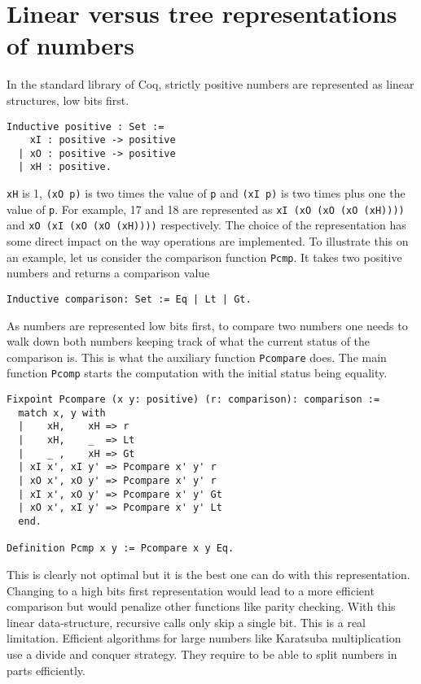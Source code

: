 \section{Linear versus tree representations of numbers\label{ZTree}}

In the standard library of {\sc Coq}, strictly positive numbers are represented as linear structures, low bits first.

\begin{verbatim}
Inductive positive : Set :=
    xI : positive -> positive 
  | xO : positive -> positive 
  | xH : positive.
\end{verbatim}
 {\tt xH} is 1, {\tt (xO p)} is two times the value of {\tt p}
 and {\tt (xI p)} is two times plus one the value of {\tt p}.
For example, 17 and 18 are represented as {\tt xI (xO (xO (xO (xH))))} and
{\tt xO (xI (xO (xO (xH))))} respectively. The choice of the representation
has some direct impact on the way operations are implemented. To illustrate this on an example,
let us consider the comparison function {\tt Pcmp}. It takes two positive numbers
and returns a comparison value
\begin{verbatim}
Inductive comparison: Set := Eq | Lt | Gt.
\end{verbatim}
As numbers are represented low bits first, to compare two numbers 
one needs to walk down both numbers keeping track of what the current status
of the comparison is. This is what the auxiliary function {\tt Pcompare} does. The main 
function {\tt Pcomp} starts the computation with the initial status being equality.
\begin{verbatim}
Fixpoint Pcompare (x y: positive) (r: comparison): comparison :=
  match x, y with
  |    xH,    xH => r
  |    xH,    _  => Lt
  |    _ ,    xH => Gt
  | xI x', xI y' => Pcompare x' y' r
  | xO x', xO y' => Pcompare x' y' r
  | xI x', xO y' => Pcompare x' y' Gt
  | xO x', xI y' => Pcompare x' y' Lt
  end.
  
Definition Pcmp x y := Pcompare x y Eq.
\end{verbatim}
This is clearly not optimal but it is the best one can do with this representation. 
Changing to a high bits first representation would lead to a more efficient
comparison but would penalize other functions like parity checking. With this linear
data-structure, recursive calls only skip a single bit. 
This is a real limitation. Efficient algorithms for large numbers like Karatsuba 
multiplication~\cite{Karat} use a divide and conquer strategy. They require to be able to split numbers
in parts efficiently. 
